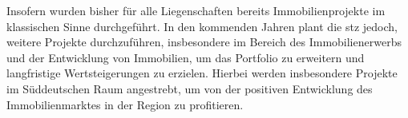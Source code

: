 \par Insofern wurden bisher für alle Liegenschaften bereits Immobilienprojekte im klassischen Sinne durchgeführt. In den kommenden Jahren plant die \gls{stz} jedoch, weitere Projekte durchzuführen, insbesondere im Bereich des Immobilienerwerbs und der Entwicklung von Immobilien, um das Portfolio zu erweitern und langfristige Wertsteigerungen zu erzielen. Hierbei werden insbesondere Projekte im Süddeutschen Raum angestrebt, um von der positiven Entwicklung des Immobilienmarktes in der Region zu profitieren.